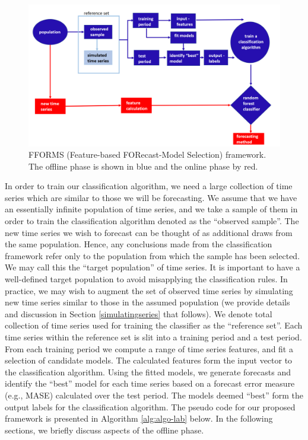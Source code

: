 \documentclass[11pt,a4paper,]{article}
\theoremstyle{definition}
\theoremstyle{definition}
\theoremstyle{definition}
\theoremstyle{remark}
\begin{document}
\begin{figure}

{\centering \includegraphics[width=\textwidth]{figures/framework} 

}

\caption{FFORMS (Feature-based FORecast-Model Selection) framework. The offline phase is shown in blue and the online phase by red.}\label{fig:framework}
\end{figure}

In order to train our classification algorithm, we need a large
collection of time series which are similar to those we will be
forecasting. We assume that we have an essentially infinite population
of time series, and we take a sample of them in order to train the
classification algorithm denoted as the ``observed sample''. The new
time series we wish to forecast can be thought of as additional draws
from the same population. Hence, any conclusions made from the
classification framework refer only to the population from which the
sample has been selected. We may call this the ``target population'' of
time series. It is important to have a well-defined target population to
avoid misapplying the classification rules. In practice, we may wish to
augment the set of observed time series by simulating new time series
similar to those in the assumed population (we provide details and
discussion in Section \ref{simulatingseries} that follows). We denote
total collection of time series used for training the classifier as the
``reference set''. Each time series within the reference set is slit
into a training period and a test period. From each training period we
compute a range of time series features, and fit a selection of
candidate models. The calculated features form the input vector to the
classification algorithm. Using the fitted models, we generate forecasts
and identify the ``best'' model for each time series based on a forecast
error measure (e.g., MASE) calculated over the test period. The models
deemed ``best'' form the output labels for the classification algorithm.
The pseudo code for our proposed framework is presented in Algorithm
\ref{alg:algo-lab} below. In the following sections, we briefly discuss
aspects of the offline phase.
\end{document}
